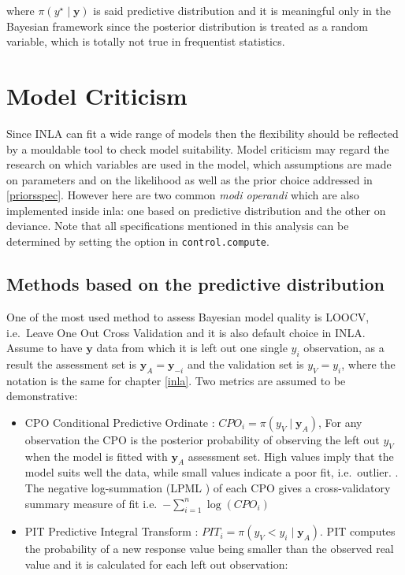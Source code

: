 \documentclass[
  12pt,
  a4paper,
  oneside]{book}
\newcommand{\passthrough}[1]{#1}
\providecommand{\tightlist}{%
  \setlength{\itemsep}{0pt}\setlength{\parskip}{0pt}}
\theoremstyle{definition}
\theoremstyle{definition}
\theoremstyle{definition}
\theoremstyle{remark}
\begin{document}
where \(\pi\left(y^{\star} \mid \boldsymbol{y}\right)\) is said predictive distribution and it is meaningful only in the Bayesian framework since the posterior distribution is treated as a random variable, which is totally not true in frequentist statistics.

\hypertarget{criticism}{%
\section{Model Criticism}\label{criticism}}

Since INLA can fit a wide range of models then the flexibility should be reflected by a mouldable tool to check model suitability. Model criticism may regard the research on which variables are used in the model, which assumptions are made on parameters and on the likelihood as well as the prior choice addressed in \ref{priorsspec}. However here are two common \emph{modi operandi} which are also implemented inside inla: one based on predictive distribution and the other on deviance. Note that all specifications mentioned in this analysis can be determined by setting the option in \passthrough{\lstinline!control.compute!}.

\hypertarget{methods-based-on-the-predictive-distribution}{%
\subsection{Methods based on the predictive distribution}\label{methods-based-on-the-predictive-distribution}}

One of the most used method to assess Bayesian model quality is LOOCV, i.e.~Leave One Out Cross Validation and it is also default choice in INLA. Assume to have \(\boldsymbol{y}\) data from which it is left out one single \(y_i\) observation, as a result the assessment set is \(\boldsymbol{y}_{A} = \boldsymbol{y}_{-i}\) and the validation set is \({y}_{V} = y_{i}\), where the notation is the same for chapter \ref{inla}. Two metrics are assumed to be demonstrative:

\begin{itemize}
\tightlist
\item
  CPO Conditional Predictive Ordinate \citep{petit1990}: \(CPO_{i} = \pi(y_{V} \mid \boldsymbol{y}_{A})\), For any observation the CPO is the posterior probability of observing the left out \(y_{V}\) when the model is fitted with \(\boldsymbol{y}_A\) assessment set. High values imply that the model suits well the data, while small values indicate a poor fit, i.e.~outlier. \citep{Bayesian_INLA_Rubio}. The negative log-summation (LPML \citet{lpml}) of each CPO gives a cross-validatory summary measure of fit \citep{wang2018bayesian} i.e.~\(-\sum_{i=1}^{n} \log \left(C P O_{i}\right)\)
\item
  PIT Predictive Integral Transform \citep{marshall2007}: \(PIT_{i} = \pi(y_{V} < y_{i} \mid \boldsymbol{y}_{A})\). PIT computes the probability of a new response value being smaller than the observed real value and it is calculated for each left out observation:
\end{itemize}
\end{document}
